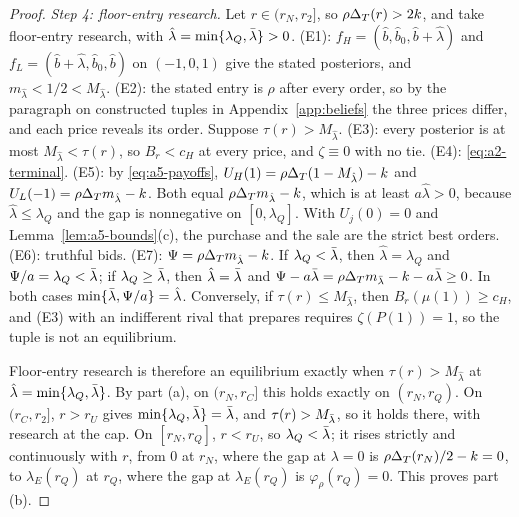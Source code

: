 \begin{proof}
\emph{Step 4: floor-entry research.} Let \(r\in(r_N,r_2]\), so \(\rho\Delta_T(r)>2k\), and take floor-entry research,
with \(\hat\lambda=\min\{\lambda_Q,\bar\lambda\}>0\). (E1): \(f_H=(\hat b,\hat b_0,\hat b+\hat\lambda)\) and
\(f_L=(\hat b+\hat\lambda,\hat b_0,\hat b)\) on \((-1,0,1)\) give the stated posteriors, and
\(m_{\hat\lambda}<1/2<M_{\hat\lambda}\). (E2): the stated entry is \(\rho\) after every order, so by the paragraph
on constructed tuples in Appendix~\ref{app:beliefs} the three prices differ, and each price reveals its order.
Suppose \(\tau(r)>M_{\hat\lambda}\). (E3): every posterior is at most \(M_{\hat\lambda}<\tau(r)\), so \(B_r<c_H\) at
every price, and \(\zeta\equiv0\) with no tie. (E4): \eqref{eq:a2-terminal}. (E5): by \eqref{eq:a5-payoffs},
\(U_H(1)=\rho\Delta_T(1-M_{\hat\lambda})-k\) and \(U_L(-1)=\rho\Delta_T m_{\hat\lambda}-k\). Both equal
\(\rho\Delta_T m_{\hat\lambda}-k\), which is at least \(a\hat\lambda>0\), because \(\hat\lambda\le\lambda_Q\) and the gap is
nonnegative on \([0,\lambda_Q]\). With \(U_j(0)=0\) and Lemma~\ref{lem:a5-bounds}(c), the purchase and the sale are
the strict best orders. (E6): truthful bids. (E7): \(\Psi=\rho\Delta_T m_{\hat\lambda}-k\). If \(\lambda_Q<\bar\lambda\), then
\(\hat\lambda=\lambda_Q\) and \(\Psi/a=\lambda_Q<\bar\lambda\); if \(\lambda_Q\ge\bar\lambda\), then \(\hat\lambda=\bar\lambda\) and
\(\Psi-a\bar\lambda=\rho\Delta_T m_{\bar\lambda}-k-a\bar\lambda\ge0\). In both cases \(\min\{\bar\lambda,\Psi/a\}=\hat\lambda\). Conversely, if
\(\tau(r)\le M_{\hat\lambda}\), then \(B_r(\mu(1))\ge c_H\), and (E3) with an indifferent rival that prepares
requires \(\zeta(P(1))=1\), so the tuple is not an equilibrium.

Floor-entry research is therefore an equilibrium exactly when \(\tau(r)>M_{\hat\lambda}\) at
\(\hat\lambda=\min\{\lambda_Q,\bar\lambda\}\). By part (a), on \((r_N,r_C]\) this holds exactly on \((r_N,r_Q)\). On
\((r_C,r_2]\), \(r>r_U\) gives \(\min\{\lambda_Q,\bar\lambda\}=\bar\lambda\), and \(\tau(r)>M_{\bar\lambda}\), so it holds there, with research
at the cap. On \([r_N,r_Q]\), \(r<r_U\), so \(\lambda_Q<\bar\lambda\); it rises strictly and continuously with \(r\), from \(0\)
at \(r_N\), where the gap at \(\lambda=0\) is \(\rho\Delta_T(r_N)/2-k=0\), to \(\lambda_E(r_Q)\) at \(r_Q\), where the gap
at \(\lambda_E(r_Q)\) is \(\varphi_\rho(r_Q)=0\). This proves part (b).


\end{proof}
